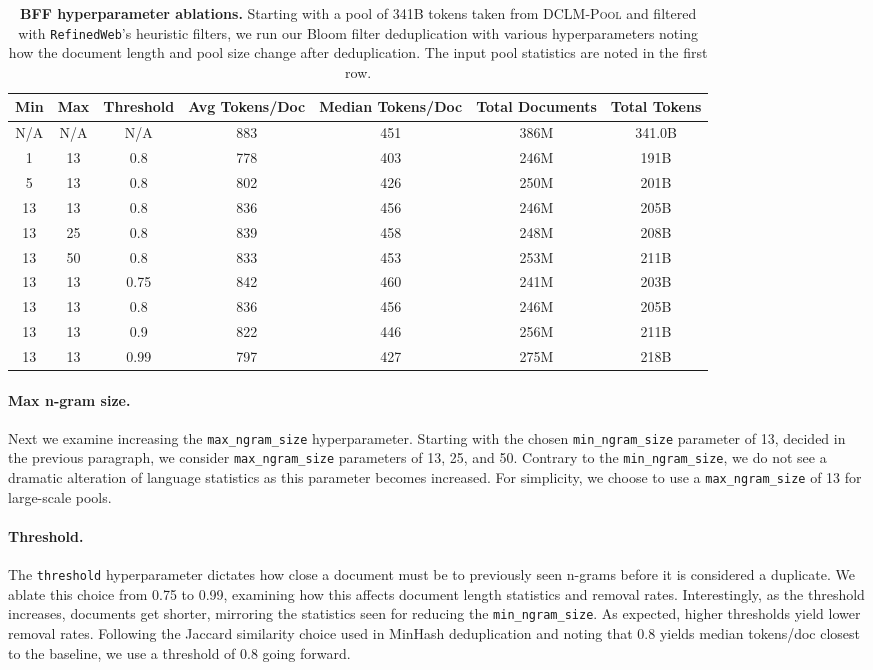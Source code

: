 \documentclass{article}
\newcommand{\rawpool}{\textsc{DCLM-Pool}\xspace}
\newcommand{\rw}{\texttt{RefinedWeb}\xspace}
\begin{document}
\begin{table}[t]
\centering
\small
\caption{\textbf{BFF hyperparameter ablations.} Starting with a pool of 341B tokens taken from \rawpool and filtered with \rw's heuristic filters, we run our Bloom filter deduplication with various hyperparameters noting how the document length and pool size change after deduplication. The input pool statistics are noted in the first row.}
\label{table:dedup-ablations-v6}
\begin{tabular}{ccc|cccc}
\toprule

Min & Max & Threshold & Avg Tokens/Doc & Median Tokens/Doc & Total Documents & Total Tokens \\
\midrule
N/A & N/A & N/A &  883 & 451 &  386M & 341.0B \\
1 & 13 & 0.8 & 778 & 403 & 246M & 191B \\
5 & 13 & 0.8 & 802 & 426 & 250M & 201B \\
13 & 13 & 0.8 & 836 & 456 & 246M & 205B \\
13 & 25 & 0.8 & 839 & 458 & 248M & 208B \\
13 & 50 & 0.8 & 833 & 453 & 253M & 211B \\
\midrule
13 & 13 & 0.75 & 842 & 460 & 241M & 203B \\
13 & 13 & 0.8 & 836 & 456 & 246M & 205B \\
13 & 13 & 0.9 & 822 & 446 & 256M & 211B \\
13 & 13 & 0.99 & 797 & 427 & 275M & 218B\\
\bottomrule
\end{tabular}
\end{table}

\paragraph{Max n-gram size.}
Next we examine increasing the \texttt{max\_ngram\_size} hyperparameter. Starting with the chosen \texttt{min\_ngram\_size} parameter of 13, decided in the previous paragraph, we consider \texttt{max\_ngram\_size} parameters of 13, 25, and 50. Contrary to the \texttt{min\_ngram\_size}, we do not see a dramatic alteration of language statistics as this parameter becomes increased. For simplicity, we choose to use a \texttt{max\_ngram\_size} of 13 for large-scale pools.

\paragraph{Threshold.}
The \texttt{threshold} hyperparameter dictates how close a document must be to previously seen n-grams before it is considered a duplicate. We ablate this choice from 0.75 to 0.99, examining how this affects document length statistics and removal rates. Interestingly, as the threshold increases, documents get shorter, mirroring the statistics seen for reducing the \texttt{min\_ngram\_size}. As expected, higher thresholds yield lower removal rates. Following the Jaccard similarity choice used in MinHash deduplication and noting that 0.8 yields median tokens/doc closest to the baseline, we use a threshold of 0.8 going forward.
\end{document}
